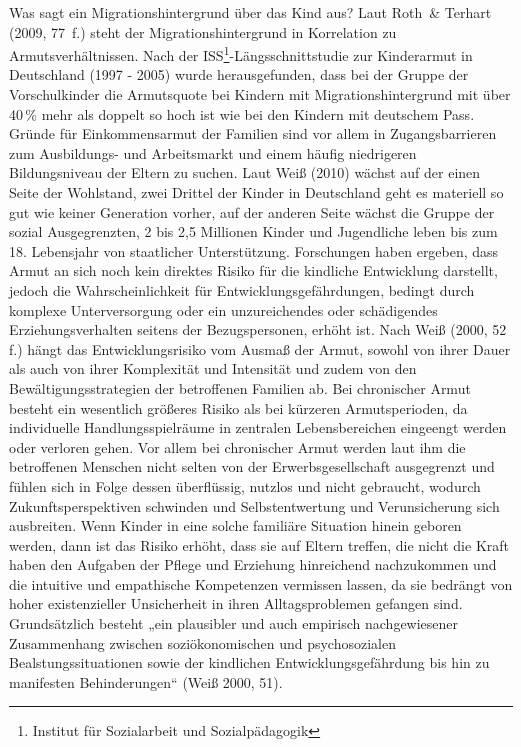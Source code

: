 Was sagt ein Migrationshintergrund über das Kind aus? Laut Roth~\& Terhart (2009, 77~f.) steht der Migrationshintergrund in Korrelation zu Armutsverhältnissen. 
Nach der ISS\footnote{Institut für Sozialarbeit und Sozialpädagogik}-Längsschnittstudie zur Kinderarmut in Deutschland (1997 - 2005) wurde herausgefunden, dass bei der Gruppe der Vorschulkinder die Armutsquote bei Kindern mit Migrationshintergrund mit über 40\,\% mehr als doppelt so hoch ist wie bei den Kindern mit deutschem Pass. Gründe für Einkommensarmut der Familien sind vor allem in Zugangsbarrieren zum Ausbildungs- und Arbeitsmarkt und einem häufig niedrigeren Bildungsniveau der Eltern zu suchen. 
Laut Weiß (2010) wächst auf der einen Seite der Wohlstand, zwei Drittel der Kinder in Deutschland geht es materiell so gut wie keiner Generation vorher, auf der anderen Seite wächst die Gruppe der sozial Ausgegrenzten, 2 bis 2,5 Millionen Kinder und Jugendliche leben bis zum 18. Lebensjahr von staatlicher Unterstützung. 
Forschungen haben ergeben, dass Armut an sich noch kein direktes Risiko für die kindliche Entwicklung darstellt, jedoch die Wahrscheinlichkeit für Entwicklungsgefährdungen, bedingt durch komplexe Unterversorgung oder ein unzureichendes oder schädigendes Erziehungsverhalten seitens der Bezugspersonen, erhöht ist. 
Nach Weiß (2000, 52 f.) hängt das Entwicklungsrisiko vom Ausmaß der Armut, sowohl von ihrer Dauer als auch von ihrer Komplexität und Intensität und zudem von den Bewältigungsstrategien der betroffenen Familien ab. Bei chronischer Armut besteht ein wesentlich größeres Risiko als bei kürzeren Armutsperioden, da individuelle Handlungsspielräume in zentralen Lebensbereichen eingeengt werden oder verloren gehen.
Vor allem bei chronischer Armut werden laut ihm die betroffenen Menschen nicht selten von der Erwerbsgesellschaft ausgegrenzt und fühlen sich in Folge dessen überflüssig, nutzlos und nicht gebraucht, wodurch Zukunftsperspektiven schwinden und Selbstentwertung und Verunsicherung sich ausbreiten. Wenn Kinder in eine solche familiäre Situation hinein geboren werden, dann ist das Risiko erhöht, dass sie auf Eltern treffen, die nicht die Kraft haben den Aufgaben der Pflege und Erziehung hinreichend nachzukommen und die intuitive und empathische Kompetenzen vermissen lassen, da sie bedrängt von hoher existenzieller Unsicherheit in ihren Alltagsproblemen gefangen sind.   
Grundsätzlich besteht „ein plausibler und auch empirisch nachgewiesener Zusammenhang zwischen soziökonomischen und psychosozialen Bealstungssituationen sowie der kindlichen Entwicklungsgefährdung bis hin zu manifesten Behinderungen“ (Weiß 2000, 51).

